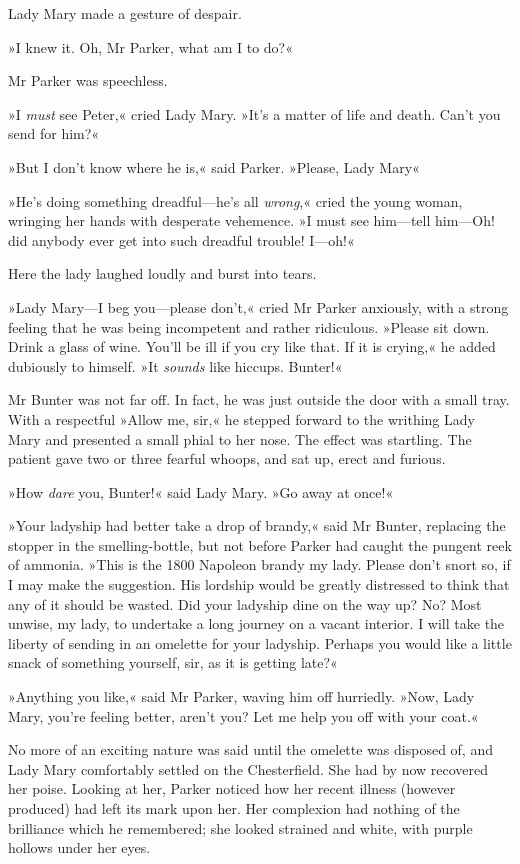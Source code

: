 Lady Mary made a gesture of despair.

»I knew it. Oh, Mr Parker, what am I to do?«

Mr Parker was speechless.

»I \textit{must} see Peter,« cried Lady Mary. »It's a matter of life and death. Can't you send for him?«

»But I don't know where he is,« said Parker. »Please, Lady Mary\longdash«

»He's doing something dreadful—he's all \textit{wrong},« cried the young woman, wringing her hands with desperate vehemence. »I must see him—tell him—Oh! did anybody ever get into such dreadful trouble! I—oh!\longdash«

Here the lady laughed loudly and burst into tears.

»Lady Mary—I beg you—please don't,« cried Mr Parker anxiously, with a strong feeling that he was being incompetent and rather ridiculous.  »Please sit down. Drink a glass of wine. You'll be ill if you cry like that. If it is crying,« he added dubiously to himself. »It \textit{sounds} like hiccups. Bunter!«

Mr Bunter was not far off. In fact, he was just outside the door with a small tray. With a respectful »Allow me, sir,« he stepped forward to the writhing Lady Mary and presented a small phial to her nose. The effect was startling. The patient gave two or three fearful whoops, and sat up, erect and furious.

»How \textit{dare} you, Bunter!« said Lady Mary. »Go away at once!«

»Your ladyship had better take a drop of brandy,« said Mr Bunter, replacing the stopper in the smelling-bottle, but not before Parker had caught the pungent reek of ammonia. »This is the 1800 Napoleon brandy my lady. Please don't snort so, if I may make the suggestion.  His lordship would be greatly distressed to think that any of it should be wasted. Did your ladyship dine on the way up? No? Most unwise, my lady, to undertake a long journey on a vacant interior. I will take the liberty of sending in an omelette for your ladyship. Perhaps you would like a little snack of something yourself, sir, as it is getting late?«

»Anything you like,« said Mr Parker, waving him off hurriedly. »Now, Lady Mary, you're feeling better, aren't you? Let me help you off with your coat.«

No more of an exciting nature was said until the omelette was disposed of, and Lady Mary comfortably settled on the Chesterfield. She had by now recovered her poise. Looking at her, Parker noticed how her recent illness (however produced) had left its mark upon her. Her complexion had nothing of the brilliance which he remembered; she looked strained and white, with purple hollows under her eyes.

